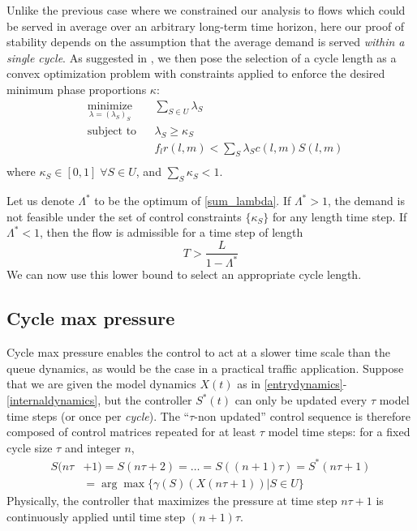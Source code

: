 Unlike the previous case where we constrained our analysis to flows which could be served in average over an arbitrary long-term time horizon, here our proof of stability depends on the assumption that the average demand is served \textit{within a single cycle}. As suggested in \cite{MaxPressureStochastic}, we then pose the selection of a cycle length as a convex optimization problem with constraints applied to enforce the desired minimum phase proportions $\kappa$:
\begin{equation} \label{sum_lambda}
\begin{aligned}
& \underset{\lambda = (\lambda_{S})_{S}}{\text{minimize}}
& & \sum_{S\in U} \lambda_{S} \\
& \text{subject to}
& &  \lambda_{S} \geq \kappa_S\\
&&& f_{l}r(l,m) < \sum_{S}\lambda_{S} c(l,m)S(l,m)\\
\end{aligned}
\end{equation}
where $\kappa_S \in [0,1] \; \forall S\in U$, and $\sum_S \kappa_S <1$. 
%

Let us denote $\Lambda^{*}$ to be the optimum of  \eqref{sum_lambda}. If $\Lambda^* > 1$, the demand is not feasible under the set of control constraints $\{\kappa_S\}$ for any length time step. If $\Lambda^* < 1$, then the flow is admissible for a time step of length 
\begin{equation} T > \frac{L}{1-\Lambda^*} \label{minTime} \end{equation} 
We can now use this lower bound to select an appropriate cycle length. 

\subsection*{Cycle max pressure}

Cycle max pressure enables the control to act at a slower time scale than the queue dynamics, as would be the case in a practical traffic application. Suppose that we are given the model dynamics $X(t)$ as in \eqref{entrydynamics}-\eqref{internaldynamics}, but the controller $S^*(t)$ can only be updated every $\tau$ model time steps (or once per \emph{cycle}). The ``$\tau$-non updated'' control sequence is therefore composed of control matrices repeated for at least $\tau$ model time steps: for a fixed cycle size $\tau$ and integer $n$, 
\begin{align} \nonumber
S(n\tau&+1)  = S(n\tau +2) = \ldots = S((n+1)\tau ) = S^*(n\tau +1) \\
&=  \arg\max\{\gamma(S)(X(n\tau +1 )) \vert S \in U\}  
 \label{CYCLE_CONTROLLER}
\end{align}
Physically, the controller that maximizes the pressure at time step $n\tau + 1$ is continuously applied until time step $(n + 1)\tau$.

